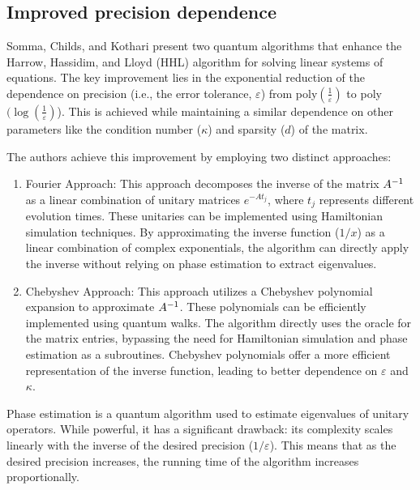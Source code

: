 \documentclass[12pt]{extarticle}
\begin{document}
\subsection{Improved precision dependence}


Somma, Childs, and Kothari\cite{somma2016quantum} present two quantum algorithms that enhance the Harrow, Hassidim, and Lloyd (HHL) algorithm for solving linear systems of equations.
The key improvement lies in the exponential reduction of the dependence on precision (i.e., the error tolerance, $\varepsilon$) from poly$(\frac{1}{\varepsilon})$ to poly$(\log(\frac{1}{\varepsilon})$).
This is achieved while maintaining a similar dependence on other parameters like the condition number ($\kappa$) and sparsity ($d$) of the matrix.

The authors achieve this improvement by employing two distinct approaches:

\begin{enumerate}
\item Fourier Approach: This approach decomposes the inverse of the matrix ${{A}^{-1}}$ as a linear combination of unitary matrices
$e^{-At_j}$, where $t_j$ represents different evolution times.
These unitaries can be implemented using Hamiltonian simulation techniques.
By approximating the inverse function ($1/x$) as a linear combination of complex exponentials,
the algorithm can directly apply the inverse without relying on phase estimation to extract eigenvalues.
\item Chebyshev Approach: This approach utilizes a Chebyshev polynomial expansion to approximate ${{A}^{-1}}$.
These polynomials can be efficiently implemented using quantum walks.
The algorithm directly uses the oracle for the matrix entries, bypassing the need for Hamiltonian simulation and phase estimation as a subroutines.
Chebyshev polynomials offer a more efficient representation of the inverse function, leading to better dependence on $\varepsilon$ and $\kappa$.
\end{enumerate}

Phase estimation is a quantum algorithm used to estimate eigenvalues of unitary operators.
While powerful, it has a significant drawback: its complexity scales linearly with the inverse of the desired precision ($1/\varepsilon$).
This means that as the desired precision increases, the running time of the algorithm increases proportionally.
\end{document}
